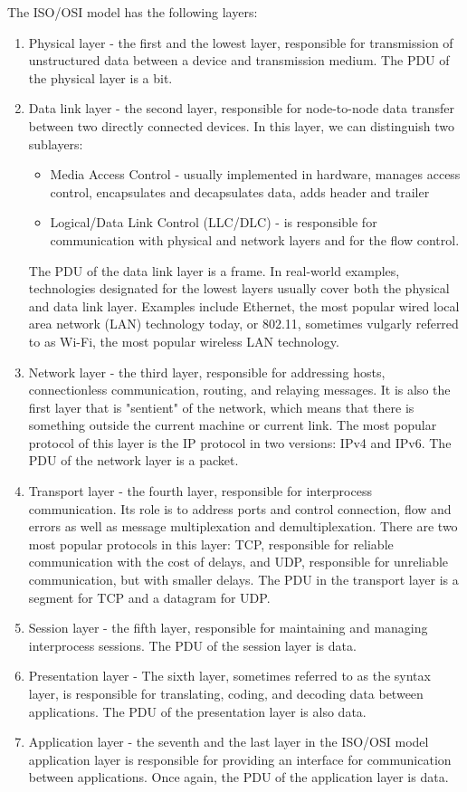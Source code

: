 The ISO/OSI model has the following layers:
\begin{enumerate}
    \item Physical layer - the first and the lowest layer, responsible for transmission of unstructured data between a device and transmission medium. The PDU of the physical layer is a bit.
    \item Data link layer - the second layer, responsible for node-to-node data transfer between two directly connected devices. In this layer, we can distinguish two sublayers:
    \begin{itemize}
        \item Media Access Control - usually implemented in hardware, manages access control, encapsulates and decapsulates data, adds header and trailer
        \item Logical/Data Link Control (LLC/DLC) - is responsible for communication with physical and network layers and for the flow control.
    \end{itemize}
    The PDU of the data link layer is a frame.
    In real-world examples, technologies designated for the lowest layers usually cover both the physical and data link layer. Examples include Ethernet, the most popular wired local area network (LAN) technology today, or 802.11, sometimes vulgarly referred to as Wi-Fi, the most popular wireless LAN technology.
    \item Network layer - the third layer, responsible for addressing hosts, connectionless communication, routing, and relaying messages. It is also the first layer that is "sentient" of the network, which means that there is something outside the current machine or current link. The most popular protocol of this layer is the IP protocol in two versions: IPv4 and IPv6. The PDU of the network layer is a packet.
    \item Transport layer - the fourth layer, responsible for interprocess communication. Its role is to address ports and control connection, flow and errors as well as message multiplexation and demultiplexation. There are two most popular protocols in this layer: TCP, responsible for reliable communication with the cost of delays, and UDP, responsible for unreliable communication, but with smaller delays. The PDU in the transport layer is a segment for TCP and a datagram for UDP.
    \item Session layer - the fifth layer, responsible for maintaining and managing interprocess sessions. The PDU of the session layer is data.
    \item Presentation layer - The sixth layer, sometimes referred to as the syntax layer, is responsible for translating, coding, and decoding data between applications. The PDU of the presentation layer is also data.
    \item Application layer - the seventh and the last layer in the ISO/OSI model application layer is responsible for providing an interface for communication between applications. Once again, the PDU of the application layer is data.
\end{enumerate}
